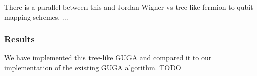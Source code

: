 \documentclass{article}
\begin{document}
There is a parallel between this and Jordan-Wigner vs tree-like fermion-to-qubit mapping schemes. ...

\subsubsection{Results}

We have implemented this tree-like GUGA and compared it to our implementation of the existing GUGA algorithm. TODO



\end{document}

